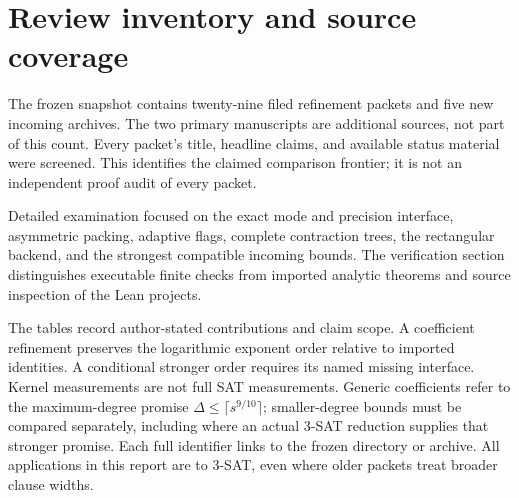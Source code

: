 \section{Review inventory and source coverage}
\label{app:inventory}

The frozen snapshot contains twenty-nine filed refinement packets and five
new incoming archives. The two primary manuscripts are additional sources,
not part of this count. Every packet's title, headline claims, and available
status material were screened. This identifies the claimed comparison
frontier; it is not an independent proof audit of every packet.

Detailed examination focused on the exact mode and precision interface,
asymmetric packing, adaptive flags, complete contraction trees, the
rectangular backend, and the strongest compatible incoming bounds.
The verification section distinguishes executable finite checks from
imported analytic theorems and source inspection of the Lean projects.

The tables record author-stated contributions and claim scope.
A coefficient refinement preserves the logarithmic exponent order relative
to imported identities. A conditional stronger order requires its named
missing interface. Kernel measurements are not full SAT measurements.
Generic coefficients refer to the maximum-degree promise
$\Delta\le\lceil s^{9/10}\rceil$; smaller-degree bounds must be compared
separately, including where an actual 3-SAT reduction supplies that stronger
promise. Each full identifier links to the frozen directory or archive.
All applications in this report are to 3-SAT, even where older packets
treat broader clause widths.

\begingroup
\small
\renewcommand{\arraystretch}{1.12}

